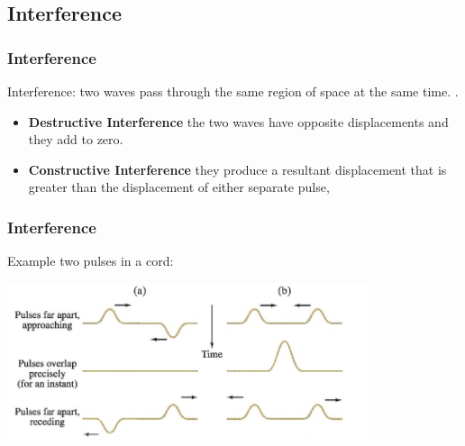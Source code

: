 \documentclass[]{beamer}
\begin{document}

\subsection{Interference}
\begin{frame}
\frametitle{Interference }




Interference: two waves pass through the same region of space at the same time. .


\pause
\begin{itemize}
\item \textbf{Destructive Interference} the two waves have opposite displacements and they
add to zero. 

\pause
\item \textbf{Constructive Interference} they produce a resultant displacement that is greater than the
displacement of either separate pulse,
\end{itemize}


  \end{frame}







\begin{frame}
\frametitle{Interference }

Example two pulses in a cord:




  \begin{center}
  \includegraphics[height=1.8in]{images4/15.jpg}
\end{center}





  \end{frame}





\end{document}

